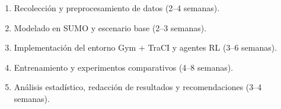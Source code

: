 
\begin{enumerate}
    \item Recolección y preprocesamiento de datos (2–4 semanas).
    \item Modelado en SUMO y escenario base (2–3 semanas).
    \item Implementación del entorno Gym + TraCI y agentes RL (3–6 semanas).
    \item Entrenamiento y experimentos comparativos (4–8 semanas).
    \item Análisis estadístico, redacción de resultados y recomendaciones (3–4 semanas).
\end{enumerate}
